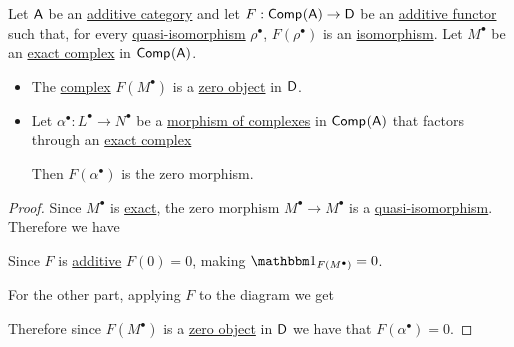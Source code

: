 \documentclass[../../../main]{subfiles}
\begin{document}
\begin{lemma}
  Let \(\mathsf{A}\) be an \hyperref[def:additive-category]{additive category} and let \(F: \mathsf{Comp}^{}(\mathsf{A}) \to \mathsf{D}\) be an \hyperref[def:additive-functor]{additive functor} such that, for every \hyperref[def:quasi-isomorphism]{quasi-isomorphism} \(\rho^{\bullet}\), \(F(\rho^{\bullet})\) is an \hyperref[def:categorical-isomorphism]{isomorphism}. Let \(M^{\bullet}\) be an \hyperref[def:exact-complex]{exact complex} in \(\mathsf{Comp}^{}(\mathsf{A})\).
  \begin{itemize}
    \item The \hyperref[def:complex]{complex} \(F(M^{\bullet})\) is a \hyperref[def:zero-object]{zero object} in \(\mathsf{D}\).
    \item Let \(\alpha^{\bullet}: L^{\bullet} \to N^{\bullet}\) be a \hyperref[def:complex-morphism]{morphism of complexes} in \(\mathsf{Comp}^{}(\mathsf{A})\) that factors through an \hyperref[def:exact-complex]{exact complex}
          \begin{center}
          \end{center}
          Then \(F(\alpha^{\bullet})\) is the zero morphism.
  \end{itemize}
\end{lemma}
\begin{proof}
  Since \(M^{\bullet}\) is \hyperref[def:exact-complex]{exact}, the zero morphism \(M^{\bullet} \to M^{\bullet}\) is a \hyperref[def:quasi-isomorphism]{quasi-isomorphism}.
  Therefore we have
  \begin{center}
  \end{center}
  Since \(F\) is \hyperref[def:additive-functor]{additive} \(F(0) = 0\), making \(\id_{F(M^{\bullet})} = 0\).

  For the other part, applying \(F\) to the diagram we get
  \begin{center}
  \end{center}
  Therefore since \(F(M^{\bullet})\) is a \hyperref[def:zero-object]{zero object} in \(\mathsf{D}\) we have that \(F(\alpha^{\bullet}) = 0\).
\end{proof}
\end{document}
